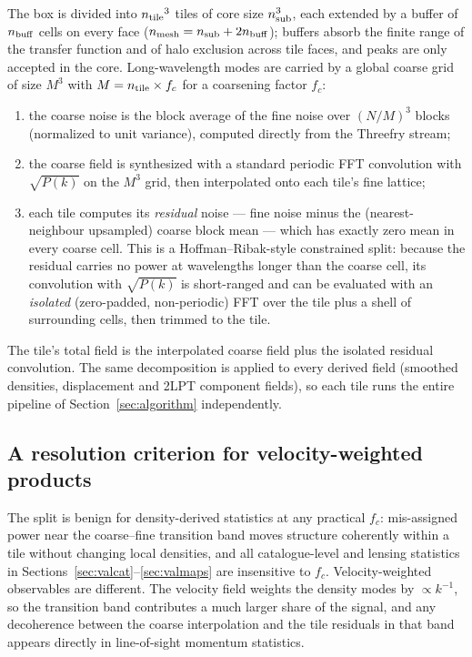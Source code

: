 The box is divided into ${n_{\rm tile}}^3$ tiles of core size
$n_{\rm sub}^3$, each extended by a buffer of $n_{\rm buff}$ cells on every
face ($n_{\rm mesh}=n_{\rm sub}+2n_{\rm buff}$); buffers absorb the finite
range of the transfer function and of halo exclusion across tile faces, and
peaks are only accepted in the core. Long-wavelength modes are carried by a
global coarse grid of size $M^3$ with $M = n_{\rm tile}\times f_c$ for a
coarsening factor $f_c$:
\begin{enumerate}
  \item the coarse noise is the block average of the fine noise over
        $(N/M)^3$ blocks (normalized to unit variance), computed directly
        from the Threefry stream;
  \item the coarse field is synthesized with a standard periodic FFT
        convolution with $\sqrt{P(k)}$ on the $M^3$ grid, then interpolated
        onto each tile's fine lattice;
  \item each tile computes its \emph{residual} noise --- fine noise minus the
        (nearest-neighbour upsampled) coarse block mean --- which has exactly
        zero mean in every coarse cell. This is a Hoffman--Ribak-style
        constrained split: because the residual carries no power at
        wavelengths longer than the coarse cell, its convolution with
        $\sqrt{P(k)}$ is short-ranged and can be evaluated with an
        \emph{isolated} (zero-padded, non-periodic) FFT over the tile plus a
        shell of surrounding cells, then trimmed to the tile.
\end{enumerate}
The tile's total field is the interpolated coarse field plus the isolated
residual convolution. The same decomposition is applied to every derived
field (smoothed densities, displacement and 2LPT component fields), so each
tile runs the entire pipeline of Section~\ref{sec:algorithm} independently.

\subsection{A resolution criterion for velocity-weighted products}
\label{sec:multires-velocity}

The split is benign for density-derived statistics at any practical $f_c$:
mis-assigned power near the coarse--fine transition band moves structure
coherently within a tile without changing local densities, and all
catalogue-level and lensing statistics in
Sections~\ref{sec:valcat}--\ref{sec:valmaps} are insensitive to $f_c$.
Velocity-weighted observables are different. The velocity field weights the
density modes by $\propto k^{-1}$, so the transition band contributes a much
larger share of the signal, and any decoherence between the coarse
interpolation and the tile residuals in that band appears directly in
line-of-sight momentum statistics.

